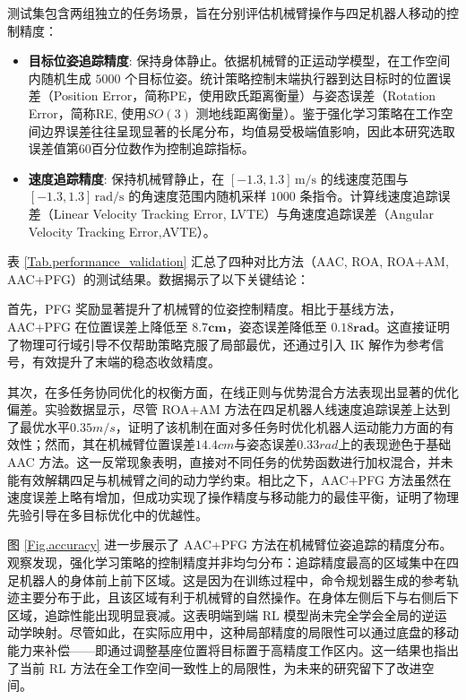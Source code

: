 测试集包含两组独立的任务场景，旨在分别评估机械臂操作与四足机器人移动的控制精度：
\begin{itemize}
    \item \textbf{目标位姿追踪精度}:
          保持身体静止。依据机械臂的正运动学模型，在工作空间内随机生成 $5000$ 个目标位姿。统计策略控制末端执行器到达目标时的位置误差（Position Error，简称PE，使用欧氏距离衡量）与姿态误差（Rotation Error，简称RE, 使用$SO(3)$ 测地线距离衡量）。鉴于强化学习策略在工作空间边界误差往往呈现显著的长尾分布，均值易受极端值影响，因此本研究选取误差值第60百分位数作为控制追踪指标。
    \item \textbf{速度追踪精度}:
          保持机械臂静止，在 $[-1.3, 1.3] \, \text{m/s}$ 的线速度范围与 $[-1.3, 1.3] \, \text{rad/s}$ 的角速度范围内随机采样 $1000$ 条指令。计算线速度追踪误差（Linear Velocity Tracking Error, LVTE）与角速度追踪误差（Angular Velocity Tracking Error,AVTE）。
\end{itemize}

表 \ref{Tab.performance_validation} 汇总了四种对比方法（AAC, ROA, ROA+AM, AAC+PFG）的测试结果。数据揭示了以下关键结论：

首先，PFG 奖励显著提升了机械臂的位姿控制精度。相比于基线方法，AAC+PFG 在位置误差上降低至 $\mathbf{8.7 \text{cm}}$，姿态误差降低至 $\mathbf{0.18 \text{rad}}$。这直接证明了物理可行域引导不仅帮助策略克服了局部最优，还通过引入 IK 解作为参考信号，有效提升了末端的稳态收敛精度。

其次，在多任务协同优化的权衡方面，在线正则与优势混合方法表现出显著的优化偏差。实验数据显示，尽管 ROA+AM 方法在四足机器人线速度追踪误差上达到了最优水平$0.35m/s$，证明了该机制在面对多任务时优化机器人运动能力方面的有效性；然而，其在机械臂位置误差$14.4cm$与姿态误差$0.33rad$上的表现逊色于基础 AAC 方法。这一反常现象表明，直接对不同任务的优势函数进行加权混合，并未能有效解耦四足与机械臂之间的动力学约束。相比之下，AAC+PFG 方法虽然在速度误差上略有增加，但成功实现了操作精度与移动能力的最佳平衡，证明了物理先验引导在多目标优化中的优越性。

图 \ref{Fig.accuracy} 进一步展示了 AAC+PFG 方法在机械臂位姿追踪的精度分布。观察发现，强化学习策略的控制精度并非均匀分布：追踪精度最高的区域集中在四足机器人的身体前上前下区域。这是因为在训练过程中，命令规划器生成的参考轨迹主要分布于此，且该区域有利于机械臂的自然操作。在身体左侧后下与右侧后下区域，追踪性能出现明显衰减。这表明端到端 RL 模型尚未完全学会全局的逆运动学映射。尽管如此，在实际应用中，这种局部精度的局限性可以通过底盘的移动能力来补偿——即通过调整基座位置将目标置于高精度工作区内。这一结果也指出了当前 RL 方法在全工作空间一致性上的局限性，为未来的研究留下了改进空间。


